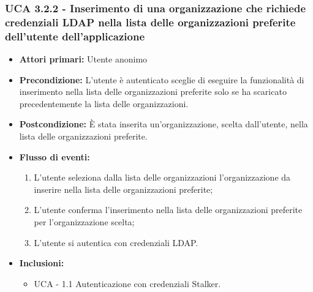 \subsubsection{UCA 3.2.2 - Inserimento di una organizzazione che richiede credenziali LDAP nella lista delle organizzazioni preferite dell'utente dell'applicazione}%
\begin{itemize}
	\item \textbf{Attori primari:} Utente anonimo
	\item \textbf{Precondizione:} L'utente è autenticato sceglie di eseguire la funzionalità di inserimento nella lista delle organizzazioni preferite solo se ha scaricato precedentemente la lista delle organizzazioni.
	\item \textbf{Postcondizione:} È stata inserita un'organizzazione, scelta dall'utente, nella lista delle organizzazioni preferite.
	\item \textbf{Flusso di eventi:}
	\begin{enumerate}
		\item L'utente seleziona dalla lista delle organizzazioni l'organizzazione da inserire nella lista delle organizzazioni preferite;
		\item L'utente conferma l'inserimento nella lista delle organizzazioni preferite per l'organizzazione scelta;
		\item L'utente si autentica con credenziali LDAP.
	\end{enumerate}
	\item \textbf{Inclusioni:}
	\begin{itemize}
			\item UCA - 1.1 Autenticazione con credenziali Stalker.
	\end{itemize}
\end{itemize}

